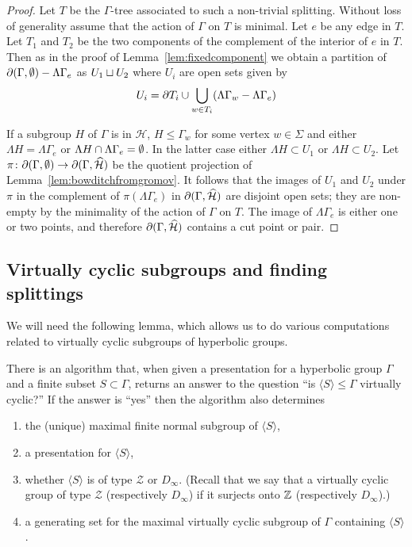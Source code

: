 \begin{proof} Let $T$ be the $\Gamma$-tree associated to such a non-trivial splitting.
Without loss of generality assume that the action of $\Gamma$ on $T$ is
minimal. Let $e$ be any edge in $T$. Let $T_1$ and $T_2$ be the two
components of the complement of the interior of $e$ in $T$. Then as in the proof of Lemma~\ref{lem:fixedcomponent}
 we obtain a partition of $\partial(\Gamma,
\emptyset) - \Lambda\Gamma_e$ as $U_1\sqcup U_2$ where $U_i$ are open
sets given by
\begin{align*}
  U_i = \partial T_i \cup \bigcup_{w \in T_i} (\Lambda\Gamma_w - \Lambda\Gamma_e)
\end{align*}

If a subgroup $H$ of $\Gamma$ is in $\mathcal{H}$, $H \leq \Gamma_w$ for some vertex $w \in \Sigma$ and either $\Lambda H =
\Lambda\Gamma_e$ or $\Lambda H \cap \Lambda\Gamma_e = \emptyset$.
In the latter case either
$\Lambda H \subset U_1$ or $\Lambda H \subset U_2$. Let $\pi \colon
\partial(\Gamma, \emptyset) \to \partial(\Gamma, \widehat{\mathcal{H}})$ be the
quotient projection of Lemma~\ref{lem:bowditchfromgromov}. It follows that the images
of $U_1$ and $U_2$ under $\pi$ in the complement of $\pi(\Lambda\Gamma_e)$ in
$\partial(\Gamma, \widehat{\mathcal{H}})$ are disjoint open sets; they are non-empty by
the minimality of the action of $\Gamma$ on $T$. The image of $\Lambda\Gamma_e$
is either one or two points, and therefore $\partial(\Gamma, \widehat{\mathcal{H}})$
contains a cut point or pair. \end{proof}

\subsection{Virtually cyclic subgroups and finding splittings}

We will need the following lemma, which allows us to do various computations
related to virtually cyclic subgroups of hyperbolic groups.

\begin{lem}\cite[Lemma 2.8]{dahmaniguirardel11}\label{lem:twoendedsubgroups}
There is an algorithm that, when given a presentation for a hyperbolic group
$\Gamma$ and a finite subset $S \subset \Gamma$, returns an answer to the
question ``is $\langle S \rangle \leq \Gamma$ virtually cyclic?'' If the
answer is ``yes'' then the algorithm also determines
\begin{enumerate}
\item the (unique) maximal finite normal subgroup of $\langle S \rangle$, 
\item a presentation for $\langle S\rangle$,
\item whether $\langle S \rangle$ is of type $\mathcal{Z}$ or $D_\infty$.
  (Recall that we say that a virtually cyclic group of type $\mathcal{Z}$
  (respectively $D_\infty$) if it surjects onto $\mathbb{Z}$ (respectively
  $D_\infty$).)
\item a generating set for the maximal virtually cyclic subgroup of $\Gamma$
  containing $\langle S\rangle$.\end{enumerate}
\end{lem}

